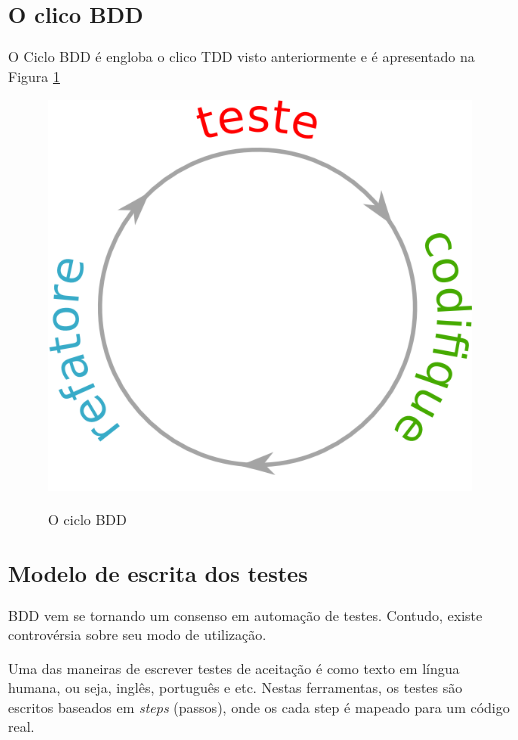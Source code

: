 
\subsection{O clico BDD}
\label{sub:o_clico_bdd}

O Ciclo BDD é engloba o clico TDD visto anteriormente e é apresentado na Figura \ref{img:ciclo-bdd}

\begin{figure}[h]
  \center
  \caption{O ciclo BDD}
  \includegraphics[scale=0.45]{images/ciclo-tdd}
  \label{img:ciclo-bdd}
\end{figure}


\subsection{Modelo de escrita dos testes}
\label{sub:modelo_de_escrita_dos_testes}

BDD vem se tornando um consenso em automação de testes. Contudo, existe controvérsia sobre seu modo de utilização.

Uma das maneiras de escrever testes de aceitação é como texto em língua humana,
ou seja, inglês, português e etc. Nestas ferramentas, os testes são escritos baseados em \textit{steps} (passos), onde os cada step é mapeado para um código real.

